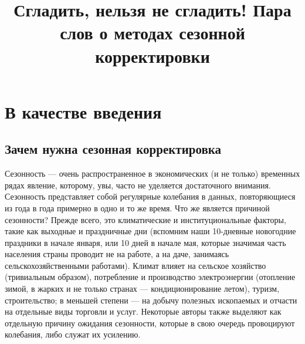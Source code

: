 \documentclass[final,pdftex]{../../template/epsilonj}\usepackage[]{graphicx}\usepackage[]{color}
\begin{document}
\begin{frontmatter}
\title{Сгладить, нельзя не сгладить! Пара слов о методах сезонной корректировки}

\begin{aug}
\author{ }%


\address{НИУ ВШЭ, Москва.}
\end{aug}

\begin{abstract}
\end{abstract}

\begin{keyword}
\end{keyword}

\end{frontmatter}


\section{В качестве введения}
\subsection{Зачем нужна сезонная корректировка}

Сезонность --- очень распространенное в экономических (и не только) временных рядах явление, которому, увы, часто не уделяется достаточного внимания. Сезонность представляет собой регулярные колебания в данных, повторяющиеся из года в года примерно в одно и то же время. Что же является причиной сезонности? Прежде всего, это климатические и институциональные факторы, такие как выходные и праздничные дни (вспомним наши 10-дневные новогодние праздники в начале января, или 10 дней в начале мая, которые значимая часть населения страны проводит не на работе, а на даче, занимаясь сельскохозяйственными работами). Климат влияет на сельское хозяйство (тривиальным образом), потребление и производство электроэнергии (отопление зимой, в жарких и не только странах –-- кондиционирование летом), туризм, строительство; в меньшей степени –-- на добычу полезных ископаемых и отчасти на отдельные виды торговли и услуг. Некоторые авторы также выделяют как отдельную причину ожидания сезонности, которые в свою очередь провоцируют колебания, либо служат их усилению. 
\end{document}
